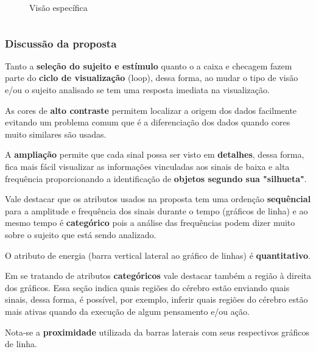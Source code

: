 \begin{frame}
\begin{columns}
\begin{column}{0.66\textwidth}
{\begin{figure}
					\caption{Visão específica}
					\label{fig:g3762}
				\end{figure}
			}
		\end{column}
	\end{columns}
\end{frame}
\begin{frame}[allowframebreaks]
	\frametitle{Discussão da proposta}
	\par Tanto a \textbf{seleção do sujeito e estímulo} quanto o a caixa e checagem fazem parte do \textbf{ciclo de visualização} (loop), dessa forma, ao mudar o tipo de visão e/ou o sujeito analisado se tem uma resposta imediata na visualização.\newline
	
	\par As cores de \textbf{alto contraste} permitem localizar a origem dos dados facilmente evitando um problema comum que é a diferenciação dos dados quando cores muito similares são usadas.\newline
	
	\par A \textbf{ampliação} permite que cada sinal possa ser visto em \textbf{detalhes}, dessa forma, fica mais fácil visualizar as informações vinculadas aos sinais de baixa e alta frequência proporcionando a identificação de \textbf{objetos segundo sua "silhueta"}.\newline
	
	\par Vale destacar que os atributos usados na proposta tem uma ordenção \textbf{sequêncial} para a amplitude e frequência dos sinais durante o tempo (gráficos de linha) e ao mesmo tempo é \textbf{categórico} pois a análise das frequências podem dizer muito sobre o sujeito que está sendo analizado.\newline
	\par O atributo de energia (barra vertical lateral ao gráfico de linhas) é \textbf{quantitativo}.\newline
	
	\par Em se tratando de atributos \textbf{categóricos} vale destacar também a região à direita dos gráficos. Essa seção indica quais regiões do cérebro estão enviando quais sinais, dessa forma, é possível, por exemplo, inferir quais regiões do cérebro estão mais ativas quando da execução de algum pensamento e/ou ação.\newline
	
	\par Nota-se a \textbf{proximidade} utilizada da barras laterais com seus respectivos gráficos de linha.\newline
	

\end{frame}
